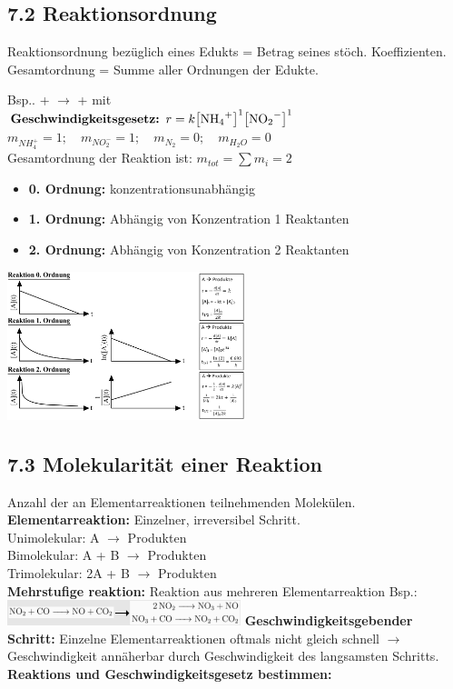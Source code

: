 \begin{multicols*}{4}
\subsection{7.2 Reaktionsordnung}{
Reaktionsordnung bezüglich eines Edukts = Betrag seines stöch. Koeffizienten.
Gesamtordnung = Summe aller Ordnungen der Edukte.\vspace*{1mm}


Bsp..  +  $\longrightarrow $  +  mit\\
 $\textbf{Geschwindigkeitsgesetz: }r=k{\left[\ce{NH_4^+}\right]}^1{\left[\ce{NO_2^-}\right]}^1$\\

    $m_{NH_4^+}=1; \quad
    m_{NO_2^-}=1; \quad
    m_{N_2}=0 ;\quad
    m_{H_2O}=0$\\

    Gesamtordnung der Reaktion ist: $m_{tot}=\sum m_i=2$
    \begin{itemize}[noitemsep,leftmargin=*]
        \item \textbf{0. Ordnung: } konzentrationsunabhängig
        \item \textbf{1. Ordnung: } Abhängig von Konzentration 1 Reaktanten
        \item \textbf{2. Ordnung: } Abhängig von Konzentration 2 Reaktanten
    \end{itemize}
    \includegraphics[width=69mm]{Bilder/Reaktionsordnung2.png}
    
}
\cb
\subsection{7.3 Molekularität einer Reaktion}{
    Anzahl der an Elementarreaktionen teilnehmenden Molekülen.\\
    \textbf{Elementarreaktion:} Einzelner, irreversibel Schritt.\\
    Unimolekular: A $\longrightarrow $ Produkten\\
    Bimolekular: A + B $\longrightarrow $ Produkten\\
    Trimolekular: 2A + B $\longrightarrow $ Produkten\\
    \textbf{Mehrstufige reaktion: }Reaktion aus mehreren Elementarreaktion Bsp.:\\
    \includegraphics[width=68mm]{Bilder/Mehrstufigereaktion.PNG}
    \textbf{Geschwindigkeitsgebender Schritt: }Einzelne Elementarreaktionen oftmals nicht gleich schnell
    $\rightarrow$ Geschwindigkeit annäherbar durch Geschwindigkeit des langsamsten Schritts.\\
    \textbf{Reaktions und Geschwindigkeitsgesetz bestimmen:}

}
\end{multicols*}
